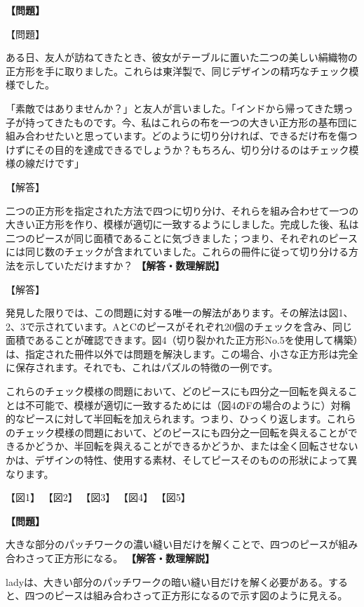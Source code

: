 \documentclass[10pt,a4paper,oneside,openany]{ltjsbook}
\begin{document}
\begin{tcolorbox}[colback=softblue,colframe=primaryblue,title=\textbf{第 174 問：絹織物の正方形 （原題: THE SQUARES OF BROCADE.）},arc=2mm,boxrule=1pt,breakable]
\textbf{【問題】}\par\vspace{0.3em}
【問題】

ある日、友人が訪ねてきたとき、彼女がテーブルに置いた二つの美しい絹織物の正方形を手に取りました。これらは東洋製で、同じデザインの精巧なチェック模様でした。

「素敵ではありませんか？」と友人が言いました。「インドから帰ってきた甥っ子が持ってきたものです。今、私はこれらの布を一つの大きい正方形の基布団に組み合わせたいと思っています。どのように切り分ければ、できるだけ布を傷つけずにその目的を達成できるでしょうか？もちろん、切り分けるのはチェック模様の線だけです」

【解答】

二つの正方形を指定された方法で四つに切り分け、それらを組み合わせて一つの大きい正方形を作り、模様が適切に一致するようにしました。完成した後、私は二つのピースが同じ面積であることに気づきました；つまり、それぞれのピースには同じ数のチェックが含まれていました。これらの冊件に従って切り分ける方法を示していただけますか？
\tcblower
\textbf{【解答・数理解説】}\par\vspace{0.3em}
【解答】

発見した限りでは、この問題に対する唯一の解法があります。その解法は図1、2、3で示されています。AとCのピースがそれぞれ20個のチェックを含み、同じ面積であることが確認できます。図4（切り裂かれた正方形No.5を使用して構築）は、指定された冊件以外では問題を解決します。この場合、小さな正方形は完全に保存されます。それでも、これはパズルの特徴の一例です。

これらのチェック模様の問題において、どのピースにも四分之一回転を與えることは不可能で、模様が適切に一致するためには（図4のFの場合のように）対稱的なピースに対して半回転を加えられます。つまり、ひっくり返します。これらのチェック模様の問題において、どのピースにも四分之一回転を與えることができるかどうか、半回転を與えることができるかどうか、または全く回転させないかは、デザインの特性、使用する素材、そしてピースそのものの形狀によって異なります。

【図1】
【図2】
【図3】
【図4】
【図5】
\end{tcolorbox}

\begin{tcolorbox}[colback=softblue,colframe=primaryblue,title=\textbf{第 175 問：もう一つのパッチワークパズル （原題: ANOTHER PATCHWORK PUZZLE.）},arc=2mm,boxrule=1pt,breakable]
\textbf{【問題】}\par\vspace{0.3em}
大きな部分のパッチワークの濃い縫い目だけを解くことで、四つのピースが組み合わさって正方形になる。
\tcblower
\textbf{【解答・数理解説】}\par\vspace{0.3em}
ladyは、大きい部分のパッチワークの暗い縫い目だけを解く必要がある。すると、四つのピースは組み合わさって正方形になるので示す図のように見える。
\end{tcolorbox}
\end{document}
